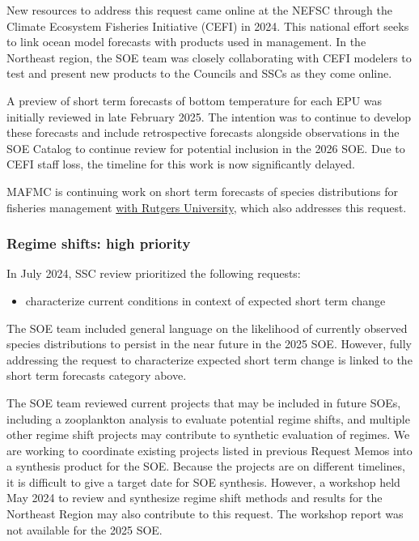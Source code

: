\documentclass[
  10pt,
]{article}
\providecommand{\tightlist}{%
  \setlength{\itemsep}{0pt}\setlength{\parskip}{0pt}}
\begin{document}
New resources to address this request came online at the NEFSC through
the Climate Ecosystem Fisheries Initiative (CEFI) in 2024. This national
effort seeks to link ocean model forecasts with products used in
management. In the Northeast region, the SOE team was closely
collaborating with CEFI modelers to test and present new products to the
Councils and SSCs as they come online.

A preview of short term forecasts of bottom temperature for each EPU was
initially reviewed in late February 2025. The intention was to continue
to develop these forecasts and include retrospective forecasts alongside
observations in the SOE Catalog to continue review for potential
inclusion in the 2026 SOE. Due to CEFI staff loss, the timeline for this
work is now significantly delayed.

MAFMC is continuing work on short term forecasts of species
distributions for fisheries management
\href{https://www.mafmc.org/s/Rutgers-Project-Overview.pdf}{with Rutgers
University}, which also addresses this request.

\subsubsection{Regime shifts: high
priority}\label{regime-shifts-high-priority}

In July 2024, SSC review prioritized the following requests:

\begin{itemize}
\tightlist
\item
  characterize current conditions in context of expected short term
  change
\end{itemize}

The SOE team included general language on the likelihood of currently
observed species distributions to persist in the near future in the 2025
SOE. However, fully addressing the request to characterize expected
short term change is linked to the short term forecasts category above.

The SOE team reviewed current projects that may be included in future
SOEs, including a zooplankton analysis to evaluate potential regime
shifts, and multiple other regime shift projects may contribute to
synthetic evaluation of regimes. We are working to coordinate existing
projects listed in previous Request Memos into a synthesis product for
the SOE. Because the projects are on different timelines, it is
difficult to give a target date for SOE synthesis. However, a workshop
held May 2024 to review and synthesize regime shift methods and results
for the Northeast Region may also contribute to this request. The
workshop report was not available for the 2025 SOE.
\end{document}
